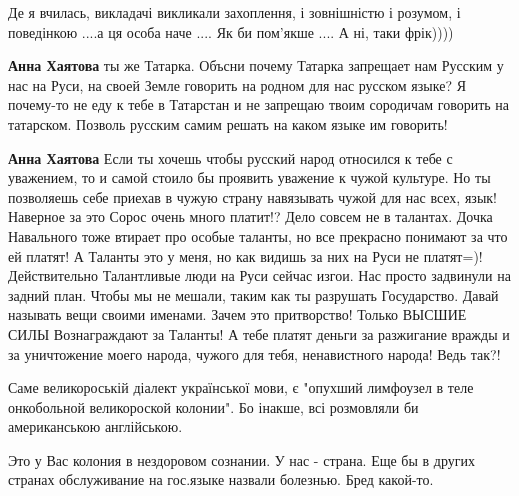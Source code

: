 \begin{itemize}
\begin{itemize}
Де я вчилась, викладачі викликали захоплення, і зовнішністю і розумом, і поведінкою ....а ця особа наче .... Як би пом'якше .... А ні, таки фрік))))


\textbf{Анна Хаятова} ты же Татарка. Объсни почему Татарка запрещает нам Русским у нас на Руси, на своей Земле говорить на родном для нас русском языке? Я почему-то не еду к тебе в Татарстан и не запрещаю твоим сородичам говорить на татарском. Позволь русским самим решать на каком языке им говорить!


\textbf{Анна Хаятова} Если ты хочешь чтобы русский народ относился к тебе с уважением, то и самой стоило бы проявить уважение к чужой культуре. Но ты позволяешь себе приехав в чужую страну навязывать чужой для нас всех, язык! Наверное за это Сорос очень много платит!? Дело совсем не в талантах. Дочка Навального тоже втирает про особые таланты, но все прекрасно понимают за что ей платят! А Таланты это у меня, но как видишь за них на Руси не платят=)! Действительно Талантливые люди на Руси сейчас изгои. Нас просто задвинули на задний план. Чтобы мы не мешали, таким как ты разрушать Государство. Давай называть вещи своими именами. Зачем это притворство! Только ВЫСШИЕ СИЛЫ Вознаграждают за Таланты! А тебе платят деньги за разжигание вражды и за уничтожение моего народа, чужого для тебя, ненавистного народа! Ведь так?!
\end{itemize}



Саме великороській діалект української мови, є "опухший лимфоузел в теле
онкобольной великороской колонии". Бо інакше, всі розмовляли би американською
англійською.




Это у Вас колония в нездоровом сознании. У нас - страна. Еще бы в других
странах обслуживание на гос.языке назвали болезнью. Бред какой-то.




\end{itemize}
